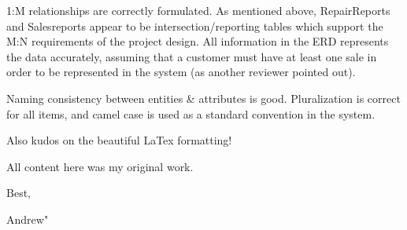 \documentclass{article}
\begin{document}
\begin{tcolorbox}[colback=secondarycolor, colframe=primarycolor, title=\textbf{Peer Review 2 - Andrew Mathena}]
\vspace{0.2cm}

1:M relationships are correctly formulated. As mentioned above, RepairReports and Salesreports appear to be intersection/reporting tables which support the M:N requirements of the project design. All information in the ERD represents the data accurately, assuming that a customer must have at least one sale in order to be represented in the system (as another reviewer pointed out).

\vspace{0.2cm}

Naming consistency between entities \& attributes is good. Pluralization is correct for all items, and camel case is used as a standard convention in the system.

\vspace{0.2cm}

Also kudos on the beautiful LaTex formatting!

\vspace{0.2cm}

All content here was my original work.

\vspace{0.2cm}

Best,

\vspace{0.2cm}

Andrew"
\vspace{0.2cm}
\end{tcolorbox}
\end{document}
